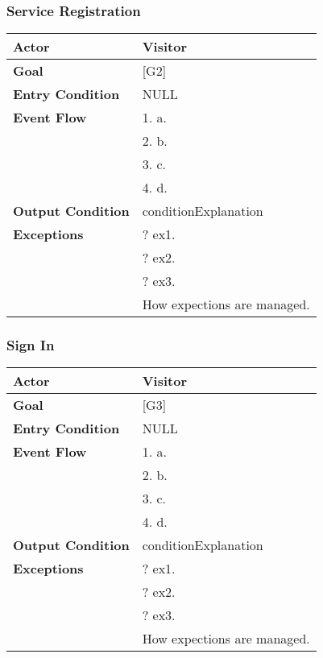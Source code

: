\subsubsection{Service Registration}
\begin{tabular}{| l | p{8cm} |}
\hline
\textbf{Actor}      &       Visitor \\
\hline
\textbf{Goal}       &       [G2]\\
\hline
\textbf{Entry Condition} &  NULL\\
\hline
\textbf{Event Flow}     &   1.	a.\\&
                                            2.	b.\\&
                                            3.	c.\\&
                                            4.  d.\\
\hline
\textbf{Output Condition} & conditionExplanation\\
\hline
\textbf{Exceptions} &       ?   ex1.\\& 
                            ?	ex2.\\&
                            ?	ex3.\\& 
                           How expections are managed.\\
\hline
\end{tabular} 


\subsubsection{Sign In}
\begin{tabular}{| l | p{8cm} |}
\hline
\textbf{Actor}      &       Visitor \\
\hline
\textbf{Goal}       &       [G3]\\
\hline
\textbf{Entry Condition} &  NULL\\
\hline
\textbf{Event Flow}     &   1.	a.\\&
                                            2.	b.\\&
                                            3.	c.\\&
                                            4.  d.\\
\hline
\textbf{Output Condition} & conditionExplanation\\
\hline
\textbf{Exceptions} &       ?   ex1.\\& 
                            ?	ex2.\\&
                            ?	ex3.\\& 
                           How expections are managed.\\
\hline
\end{tabular} 


